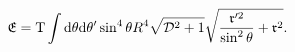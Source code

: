 \begin{equation}
\frak{E}=\mathrm{T}\int \mathrm{d}\theta \mathrm{d}\theta ^{\prime }\sin
^{4}\theta R^{4}\sqrt{\mathcal{D}^{2}+1}\sqrt{\frac{\frak{r}^{\prime 2}}{%
\sin ^{2}\theta }+\frak{r}^{2}}.
\end{equation}


